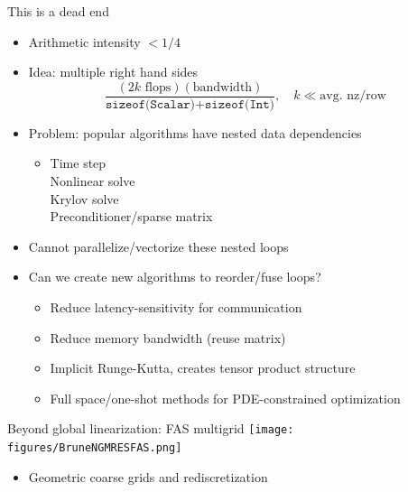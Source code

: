 \documentclass{beamer}
\begin{document}
\begin{frame}{This is a dead end}
  \begin{itemize}
  \item Arithmetic intensity $< 1/4$
  \item Idea: multiple right hand sides
    \begin{equation*}
      \frac{(2 k \text{ flops})(\text{bandwidth})}{\texttt{sizeof(Scalar)} + \texttt{sizeof(Int)}}, \quad k \ll \text{avg. nz/row}
    \end{equation*}
  \item Problem: popular algorithms have nested data dependencies
    \begin{itemize}
    \item Time step \\
      \qquad Nonlinear solve \\
      \qquad \qquad Krylov solve \\
      \qquad \qquad \qquad Preconditioner/sparse matrix
    \end{itemize}
  \item Cannot parallelize/vectorize these nested loops
  \item<2> \alert{Can we create new algorithms to reorder/fuse loops?}
    \begin{itemize}
    \item Reduce latency-sensitivity for communication
    \item Reduce memory bandwidth (reuse matrix)
    \item Implicit Runge-Kutta, creates tensor product structure
    \item Full space/one-shot methods for PDE-constrained optimization
    \end{itemize}
  \end{itemize}
\end{frame}

\begin{frame}{Beyond global linearization: FAS multigrid}
  \texttt{[image: figures/BruneNGMRESFAS.png]}
  \begin{itemize}
  \item Geometric coarse grids and rediscretization
  \end{itemize}
\end{frame}
\end{document}

